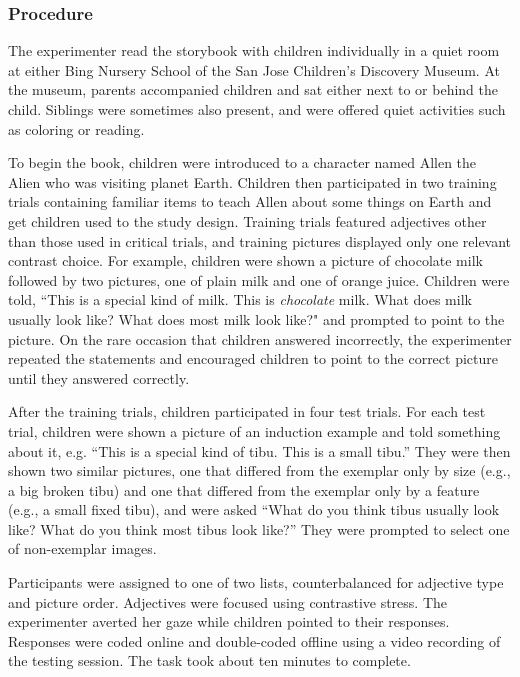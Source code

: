 \documentclass[man]{apa2}
\begin{document}
\subsubsection{Procedure}

The experimenter read the storybook with children individually in a quiet room at either Bing Nursery School of the San Jose Children's Discovery Museum.  At the museum, parents accompanied children and sat either next to or behind the child.  Siblings were sometimes also present, and were offered quiet activities such as coloring or reading. 

To begin the book, children were introduced to a character named Allen the Alien who was visiting planet Earth.  Children then participated in two training trials containing familiar items to teach Allen about some things on Earth and get children used to the study design.  Training trials featured adjectives other than those used in critical trials, and training pictures displayed only one relevant contrast choice.  For example, children were shown a picture of chocolate milk followed by two pictures, one of plain milk and one of orange juice.  Children were told, ``This is a special kind of milk.  This is \emph{chocolate} milk.  What does milk usually look like?  What does most milk look like?" and prompted to point to the picture.  On the rare occasion that children answered incorrectly, the experimenter repeated the statements and encouraged children to point to the correct picture until they answered correctly.  

After the training trials, children participated in four test trials.  For each test trial, children were shown a picture of an induction example and told something about it, e.g. ``This is a special kind of tibu.  This is a small tibu.''  They were then shown two similar pictures, one that differed from the exemplar only by size (e.g., a big broken tibu) and one that differed from the exemplar only by a feature (e.g., a small fixed tibu), and were asked ``What do you think tibus usually look like?  What do you think most tibus look like?'' They were prompted to select one of non-exemplar images.  

Participants were assigned to one of two lists, counterbalanced for adjective type and picture order.  Adjectives were focused using contrastive stress. The experimenter averted her gaze while children pointed to their responses.  Responses were coded online and double-coded offline using a video recording of the testing session.  The task took about ten minutes to complete. 
\end{document}
